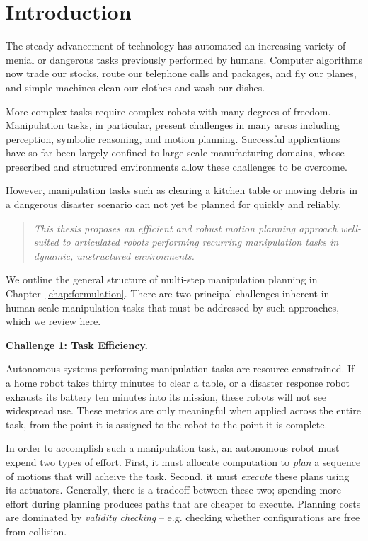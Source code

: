 \chapter{Introduction}

The steady advancement of technology
has automated an increasing variety of menial or dangerous tasks
previously performed by humans.
Computer algorithms now trade our stocks,
route our telephone calls and packages,
and fly our planes,
and simple machines clean our clothes and wash our dishes.

More complex tasks require complex robots with many
degrees of freedom.
Manipulation tasks, in particular,
present challenges in many areas including
perception, symbolic reasoning, and motion planning.
Successful applications have so far been largely
confined to large-scale manufacturing domains,
whose prescribed and structured environments
allow these challenges to be overcome.

However,
manipulation tasks such as clearing a kitchen table
or moving debris in a dangerous disaster scenario
can not yet be planned for quickly and reliably.
\begin{quote}
\emph{%
This thesis proposes an
efficient and robust motion planning approach
well-suited
to articulated robots
performing recurring manipulation tasks
in dynamic, unstructured environments.
}
\end{quote}

We outline the general structure of multi-step manipulation planning
in Chapter~\ref{chap:formulation}.
There are two principal challenges inherent in
human-scale manipulation tasks
that must be addressed by such approaches,
which we review here.

\textbf{Challenge 1: Task Efficiency.}

Autonomous systems performing manipulation tasks are
resource-constrained.
If a home robot takes thirty minutes to clear a table,
or a disaster response robot exhausts its battery ten minutes
into its mission,
these robots will not see widespread use.
These metrics are only meaningful
when applied across the entire task,
from the point it is assigned to the robot
to the point it is complete.

In order to accomplish such a manipulation task,
an autonomous robot must expend two types of effort.
First, it must allocate computation to \emph{plan}
a sequence of motions that will acheive the task.
Second, it must \emph{execute} these plans using its actuators.
Generally, there is a tradeoff between these two;
spending more effort during planning produces paths that are
cheaper to execute.
Planning costs are dominated by \emph{validity checking} --
e.g. checking whether configurations are free from collision.

